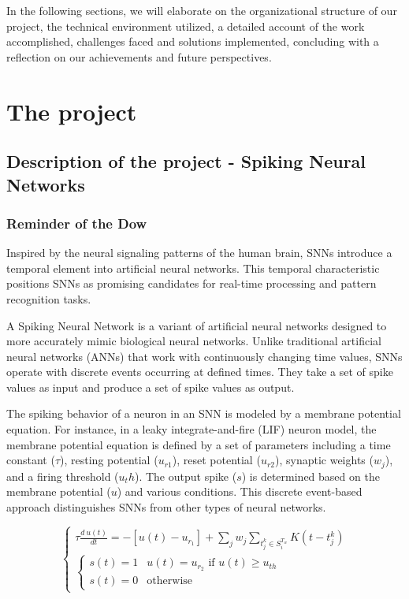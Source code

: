 \documentclass[11pt]{article}
\begin{document}
In the following sections, we will elaborate on the organizational structure of our project, the technical environment utilized, a detailed account of the work accomplished, challenges faced and solutions implemented, concluding with a reflection on our achievements and future perspectives.





\pagebreak

\section{The project}

\subsection{Description of the project - Spiking Neural Networks}

\subsubsection{Reminder of the Dow}

Inspired by the neural signaling patterns of the human brain, SNNs introduce a temporal element into artificial neural networks. This temporal characteristic positions SNNs as promising candidates for real-time processing and pattern recognition tasks.

A Spiking Neural Network is a variant of artificial neural networks designed to more accurately mimic biological neural networks. Unlike traditional artificial neural networks (ANNs) that work with continuously changing time values, SNNs operate with discrete events occurring at defined times. They take a set of spike values as input and produce a set of spike values as output.

The spiking behavior of a neuron in an SNN is modeled by a membrane potential equation. For instance, in a leaky integrate-and-fire (LIF) neuron model, the membrane potential equation is defined by a set of parameters including a time constant ($\tau$), resting potential ($u_{r1}$), reset potential ($u_{r2}$), synaptic weights ($w_j$), and a firing threshold ($u_th$). The output spike ($s$) is determined based on the membrane potential ($u$) and various conditions. This discrete event-based approach distinguishes SNNs from other types of neural networks.\cite{rething_comparison_ann_snn}

\begin{equation}
  \begin{cases}
    \tau \frac{d \: u(t)}{dt} = - [u(t) - u_{r_1}] + \sum_j w_j \sum_{t_j^k \in  S_i^{T_w}} K(t - t_j^k) \\
    \begin{cases}
      s(t) = 1 & u(t) = u_{r_2} \text{ if } u(t) \geq u_{th} \\
      s(t) = 0 & \text{otherwise}
    \end{cases}
  \end{cases}
  \label{eq:membrane_potential}
\end{equation}
\end{document}
